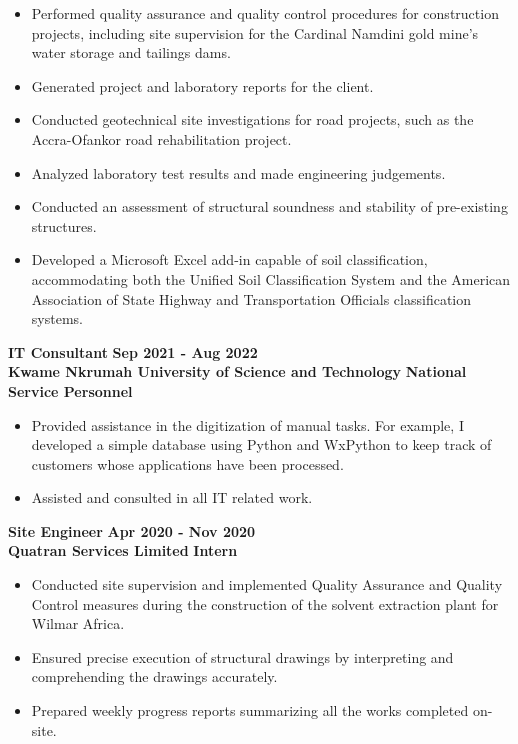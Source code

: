\documentclass[letterpaper, 11pt]{article}
\newcommand{\verticalSpace}{4pt}
\begin{document}
\begin{itemize}[leftmargin=*]

	\item Performed quality assurance and quality control procedures for construction projects, including site supervision for the Cardinal Namdini gold mine's water storage and tailings dams.
	\item Generated project and laboratory reports for the client.
	\item Conducted geotechnical site investigations for road projects, such as the Accra-Ofankor
	      road rehabilitation project.
	\item Analyzed laboratory test results and made engineering judgements.
	\item Conducted an assessment of structural soundness and stability of pre-existing structures.
	\item Developed a Microsoft Excel add-in capable of soil classification, accommodating both the
	      Unified Soil Classification System and the
	      American Association of State Highway and Transportation Officials classification systems.

\end{itemize}

\textbf{IT Consultant} \hfill \textbf{Sep 2021 - Aug 2022} \\ [\verticalSpace]
\textbf{Kwame Nkrumah University of Science and Technology} \hfill \textbf{National Service Personnel}

\begin{itemize}[leftmargin=*]

	\item Provided assistance in the digitization of manual tasks. For example,
	      I developed a simple database using Python and WxPython to keep track of
	      customers whose applications have been processed.
	\item Assisted and consulted in all IT related work.

\end{itemize}

\textbf{Site Engineer} \hfill \textbf{Apr 2020 - Nov 2020} \\ [\verticalSpace]
\textbf{Quatran Services Limited} \hfill \textbf{Intern}

\begin{itemize}[leftmargin=*]

	\item Conducted site supervision and implemented Quality Assurance and Quality Control
	      measures during the construction of the solvent extraction plant for Wilmar Africa.
	\item Ensured precise execution of structural drawings by interpreting and comprehending
	      the drawings accurately.
	\item Prepared weekly progress reports summarizing all the works completed on-site.

\end{itemize}
\end{document}
